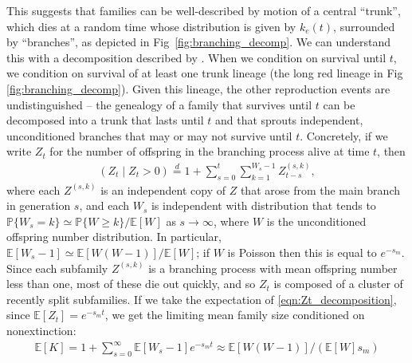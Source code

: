 \documentclass[10pt,letterpaper]{article}
\newcommand{\citet}[1]{\cite{#1}}
\renewcommand{\P}{\mathbb{P}}
\newcommand{\E}{\mathbb{E}}
\newcommand{\deq}{\stackrel{\scriptscriptstyle{d}}{=}}
\begin{document}
This suggests that families can be well-described by motion of a central ``trunk'',
which dies at a random time whose distribution is given by $k_e(t)$,
surrounded by ``branches'',
as depicted in Fig~\ref{fig:branching_decomp}.
We can understand this with a decomposition described by \citet{geiger1999elementary}.
When we condition on survival until $t$, we condition on survival of at least one trunk lineage
(the long red lineage in Fig \ref{fig:branching_decomp}).
Given this lineage, the other reproduction events are undistinguished --
the genealogy of a family that survives until $t$
can be decomposed into a trunk that lasts until $t$
and that sprouts independent, unconditioned branches that may or may not survive until $t$.
Concretely, if we write $Z_t$ for the number of offspring in the branching process alive at time $t$,
then
\begin{align} \label{eqn:Zt_decomposition}
  \left( Z_t \; \vert \; Z_t>0 \right) \deq 1 + \sum_{s=0}^t \sum_{k=1}^{W_s-1} Z^{(s,k)}_{t-s},
\end{align}
where each $Z^{(s,k)}$ is an independent copy of $Z$ 
that arose from the main branch in generation $s$,
and each $W_s$ is independent with distribution 
that tends to $\P\{W_s=k\} \simeq \P\{W\ge k\}/\E[W]$ as $s \to \infty$,
where $W$ is the unconditioned offspring number distribution.  
In particular, $\E[W_s-1] \simeq \E[W(W-1)]/\E[W]$;
if $W$ is Poisson then this is equal to $e^{-s_m}$.
Since each subfamily $Z^{(s,k)}$ is a branching process with mean offspring number less than one,
most of these die out quickly,
and so $Z_t$ is composed of a cluster of recently split subfamilies.
If we take the expectation of \eqref{eqn:Zt_decomposition},
since $\E[Z_t] = e^{-s_m t}$,
we get the limiting mean family size conditioned on nonextinction:
\begin{align} \label{eqn:mean_K}
    \E[K] 
    = 1 + \sum_{s=0}^\infty \E[W_s-1] e^{-s_m t}
    \approx \E[W(W-1)] / ( \E[W] s_m  )
\end{align}
\end{document}
